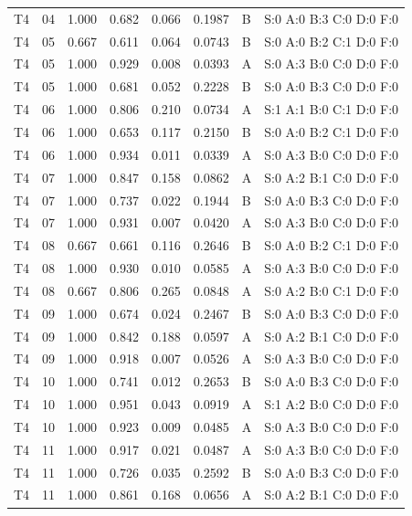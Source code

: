 \begin{longtable}{lrrrrrll}
T4 & 04 & 1.000 & 0.682 & 0.066 & 0.1987 & B & \tiny S:0 A:0 B:3 C:0 D:0 F:0 \\
T4 & 05 & 0.667 & 0.611 & 0.064 & 0.0743 & B & \tiny S:0 A:0 B:2 C:1 D:0 F:0 \\
T4 & 05 & 1.000 & 0.929 & 0.008 & 0.0393 & A & \tiny S:0 A:3 B:0 C:0 D:0 F:0 \\
T4 & 05 & 1.000 & 0.681 & 0.052 & 0.2228 & B & \tiny S:0 A:0 B:3 C:0 D:0 F:0 \\
T4 & 06 & 1.000 & 0.806 & 0.210 & 0.0734 & A & \tiny S:1 A:1 B:0 C:1 D:0 F:0 \\
T4 & 06 & 1.000 & 0.653 & 0.117 & 0.2150 & B & \tiny S:0 A:0 B:2 C:1 D:0 F:0 \\
T4 & 06 & 1.000 & 0.934 & 0.011 & 0.0339 & A & \tiny S:0 A:3 B:0 C:0 D:0 F:0 \\
T4 & 07 & 1.000 & 0.847 & 0.158 & 0.0862 & A & \tiny S:0 A:2 B:1 C:0 D:0 F:0 \\
T4 & 07 & 1.000 & 0.737 & 0.022 & 0.1944 & B & \tiny S:0 A:0 B:3 C:0 D:0 F:0 \\
T4 & 07 & 1.000 & 0.931 & 0.007 & 0.0420 & A & \tiny S:0 A:3 B:0 C:0 D:0 F:0 \\
T4 & 08 & 0.667 & 0.661 & 0.116 & 0.2646 & B & \tiny S:0 A:0 B:2 C:1 D:0 F:0 \\
T4 & 08 & 1.000 & 0.930 & 0.010 & 0.0585 & A & \tiny S:0 A:3 B:0 C:0 D:0 F:0 \\
T4 & 08 & 0.667 & 0.806 & 0.265 & 0.0848 & A & \tiny S:0 A:2 B:0 C:1 D:0 F:0 \\
T4 & 09 & 1.000 & 0.674 & 0.024 & 0.2467 & B & \tiny S:0 A:0 B:3 C:0 D:0 F:0 \\
T4 & 09 & 1.000 & 0.842 & 0.188 & 0.0597 & A & \tiny S:0 A:2 B:1 C:0 D:0 F:0 \\
T4 & 09 & 1.000 & 0.918 & 0.007 & 0.0526 & A & \tiny S:0 A:3 B:0 C:0 D:0 F:0 \\
T4 & 10 & 1.000 & 0.741 & 0.012 & 0.2653 & B & \tiny S:0 A:0 B:3 C:0 D:0 F:0 \\
T4 & 10 & 1.000 & 0.951 & 0.043 & 0.0919 & A & \tiny S:1 A:2 B:0 C:0 D:0 F:0 \\
T4 & 10 & 1.000 & 0.923 & 0.009 & 0.0485 & A & \tiny S:0 A:3 B:0 C:0 D:0 F:0 \\
T4 & 11 & 1.000 & 0.917 & 0.021 & 0.0487 & A & \tiny S:0 A:3 B:0 C:0 D:0 F:0 \\
T4 & 11 & 1.000 & 0.726 & 0.035 & 0.2592 & B & \tiny S:0 A:0 B:3 C:0 D:0 F:0 \\
T4 & 11 & 1.000 & 0.861 & 0.168 & 0.0656 & A & \tiny S:0 A:2 B:1 C:0 D:0 F:0 \\

\end{longtable}
